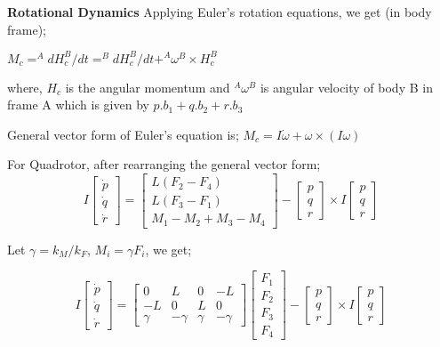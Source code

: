 \textbf{Rotational Dynamics} Applying Euler's rotation equations, we get (in body frame);
\vspace{10pt}

$M_c = ^AdH_c^B/dt = ^BdH_c^B/dt + ^A\omega^B \times H_c^B$

where, $H_c$ is the angular momentum and $^A\omega^B$ is angular velocity of body B in frame A which is given by $p.b_1 + q.b_2 + r.b_3$
\vspace{10pt}

General vector form of Euler's equation is;
$M_c = I\dot{\omega} + \omega \times (I\omega)$
\vspace{10pt}

For Quadrotor, after rearranging the general vector form;
\[
I\begin{bmatrix}
    \dot{p} \\
    \dot{q} \\
    \dot{r}
\end{bmatrix} = 
\begin{bmatrix}
    L(F_2 - F_4) \\
    L(F_3 - F_1) \\
    M_1 - M_2 + M_3 - M_4
\end{bmatrix} - 
\begin{bmatrix}
    p \\
    q \\
    r
\end{bmatrix}
\times I\begin{bmatrix}
    p \\
    q \\
    r
\end{bmatrix}
\]
\vspace{10pt}

Let $\gamma = k_M/k_F$, $M_i = \gamma F_i$, we get;
\vspace{10pt}

\[
I\begin{bmatrix}
    \dot{p} \\
    \dot{q} \\
    \dot{r}
\end{bmatrix} = 
\begin{bmatrix}
    0 & L & 0 & -L \\
    -L & 0 & L & 0 \\
    \gamma & -\gamma & \gamma & -\gamma
\end{bmatrix}
\begin{bmatrix}
    F_1 \\
    F_2 \\
    F_3 \\
    F_4
\end{bmatrix}- 
\begin{bmatrix}
    p \\
    q \\
    r
\end{bmatrix}
\times I\begin{bmatrix}
    p \\
    q \\
    r
\end{bmatrix}
\]
\\

